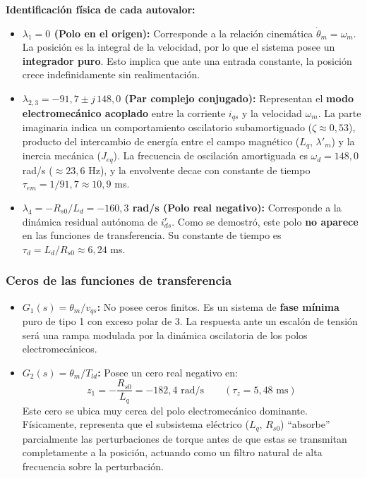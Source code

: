 \documentclass[12pt, a4paper,journal, onecolumn, compsoc]{IEEEtran}
\begin{document}
\textbf{Identificación física de cada autovalor:} \mbox{}

\begin{itemize}
    \item \textbf{$\lambda_1 = 0$ (Polo en el origen):} Corresponde a la relación cinemática $\dot{\theta}_m = \omega_m$. La posición es la integral de la velocidad, por lo que el sistema posee un \textbf{integrador puro}. Esto implica que ante una entrada constante, la posición crece indefinidamente sin realimentación.

    \item \textbf{$\lambda_{2,3} = -91{,}7 \pm j\,148{,}0$ (Par complejo conjugado):} Representan el \textbf{modo electromecánico acoplado} entre la corriente $i_{qs}$ y la velocidad $\omega_m$. La parte imaginaria indica un comportamiento oscilatorio subamortiguado ($\zeta \approx 0{,}53$), producto del intercambio de energía entre el campo magnético ($L_q$, $\lambda'_m$) y la inercia mecánica ($J_{eq}$). La frecuencia de oscilación amortiguada es $\omega_d = 148{,}0$ rad/s ($\approx 23{,}6$ Hz), y la envolvente decae con constante de tiempo $\tau_{em} = 1/91{,}7 \approx 10{,}9$ ms.

    \item \textbf{$\lambda_4 = -R_{s0}/L_d = -160{,}3$ rad/s (Polo real negativo):} Corresponde a la dinámica residual autónoma de $i_{ds}^r$. Como se demostró, este polo \textbf{no aparece} en las funciones de transferencia. Su constante de tiempo es $\tau_d = L_d/R_{s0} \approx 6{,}24$ ms.
\end{itemize}

\subsubsection{Ceros de las funciones de transferencia}

\begin{itemize}
    \item \textbf{$G_1(s) = \theta_m / v_{qs}$:} No posee ceros finitos. Es un sistema de \textbf{fase mínima} puro de tipo 1 con exceso polar de 3. La respuesta ante un escalón de tensión será una rampa modulada por la dinámica oscilatoria de los polos electromecánicos.

    \item \textbf{$G_2(s) = \theta_m / T_{ld}$:} Posee un cero real negativo en:
    \begin{equation}
        z_1 = -\frac{R_{s0}}{L_q} = -182{,}4 \text{ rad/s} \qquad (\tau_z = 5{,}48 \text{ ms})
    \end{equation}
    Este cero se ubica muy cerca del polo electromecánico dominante. Físicamente, representa que el subsistema eléctrico ($L_q$, $R_{s0}$) ``absorbe'' parcialmente las perturbaciones de torque antes de que estas se transmitan completamente a la posición, actuando como un filtro natural de alta frecuencia sobre la perturbación.
\end{itemize}
\end{document}
